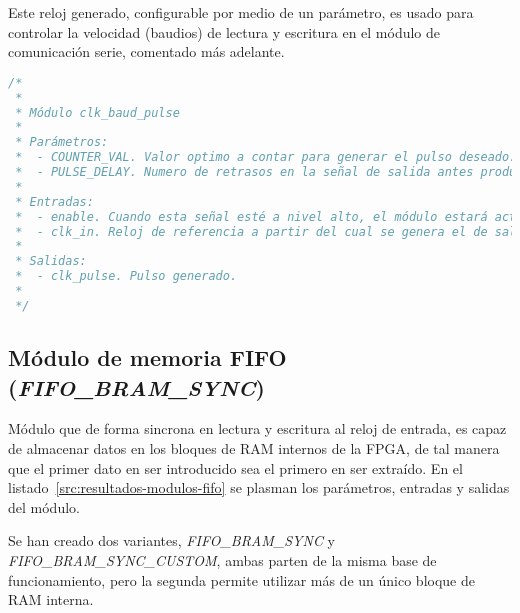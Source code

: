 Este reloj generado, configurable por medio de un parámetro, es usado para controlar la velocidad (baudios) de lectura y escritura en el módulo de comunicación serie, comentado más adelante.

\begin{lstlisting}[language=Verilog,
    caption={Parámetros, entradas y salidas del módulo clk\_baud\_pulse.},
    label=src:resultados-modulos-clk-baud-pulse]
/*
 *
 * Módulo clk_baud_pulse
 *
 * Parámetros:
 *  - COUNTER_VAL. Valor optimo a contar para generar el pulso deseado.
 *  - PULSE_DELAY. Numero de retrasos en la señal de salida antes producir un pulso.
 *
 * Entradas:
 *  - enable. Cuando esta señal esté a nivel alto, el módulo estará activo, y en caso contrario la salida estará siempre a nivel bajo, reiniciando además sus registros internos.
 *  - clk_in. Reloj de referencia a partir del cual se genera el de salida.
 *
 * Salidas:
 *  - clk_pulse. Pulso generado.
 *
 */
\end{lstlisting}


\subsection{Módulo de memoria FIFO (\emph{FIFO\_BRAM\_SYNC})}
Módulo que de forma sincrona en lectura y escritura al reloj de entrada, es capaz de almacenar datos en los bloques de RAM internos de la FPGA, de tal manera que el primer dato en ser introducido sea el primero en ser extraído. En el listado~\ref{src:resultados-modulos-fifo} se plasman los parámetros, entradas y salidas del módulo.

Se han creado dos variantes, \emph{FIFO\_BRAM\_SYNC} y \emph{FIFO\_BRAM\_SYNC\_CUSTOM}, ambas parten de la misma base de funcionamiento, pero la segunda permite utilizar más de un único bloque de RAM interna.

